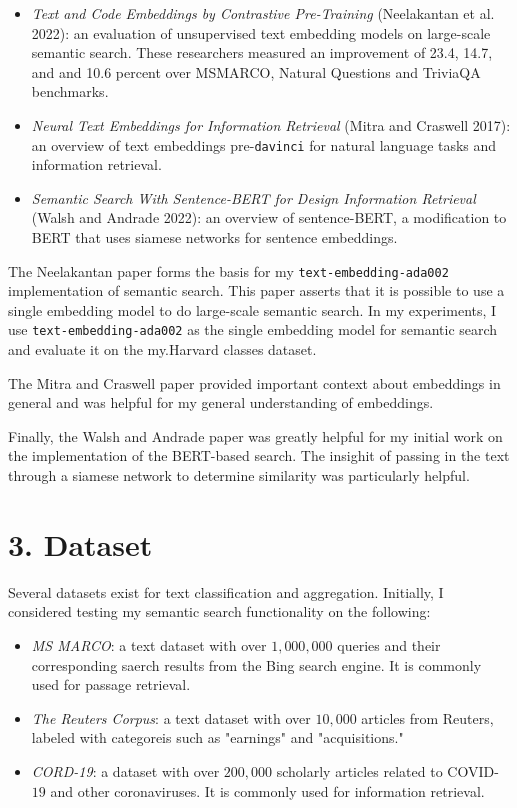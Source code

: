 \documentclass[
	a4paper, %
	10pt, %
	unnumberedsections, %
	twoside, %
]{LTJournalArticle}
\begin{document}
\begin{itemize}
	\item \textit{Text and Code Embeddings by Contrastive Pre-Training} (Neelakantan et al. 2022): an evaluation of unsupervised text embedding models on large-scale semantic search. These researchers measured an improvement of 23.4, 14.7, and and 10.6 percent over MSMARCO, Natural Questions and TriviaQA benchmarks. 
	\item \textit{Neural Text Embeddings for Information Retrieval} (Mitra and Craswell 2017): an overview of text embeddings pre-\texttt{davinci} for natural language tasks and information retrieval. 
	\item \textit{Semantic Search With Sentence-BERT for Design Information Retrieval} (Walsh and Andrade 2022): an overview of sentence-BERT, a modification to BERT that uses siamese networks for sentence embeddings. 
\end{itemize}

The Neelakantan paper forms the basis for my \texttt{text-embedding-ada002} implementation of semantic search. This paper asserts that it is possible to use a single embedding model to do large-scale semantic search. In my experiments, I use \texttt{text-embedding-ada002}  as the single embedding model for semantic search and evaluate it on the my.Harvard classes dataset. 

The Mitra and Craswell paper provided important context about embeddings in general and was helpful for my general understanding of embeddings.

Finally, the Walsh and Andrade paper was greatly helpful for my initial work on the implementation of the BERT-based search. The insighit of passing in the text through a siamese network to determine similarity was particularly helpful. 

\section{3. Dataset}

Several datasets exist for text classification and  aggregation. Initially, I considered testing my semantic search functionality on the following: 
\begin{itemize}
	\item \textit{MS MARCO}: a text dataset with over $1,000,000$ queries and their corresponding saerch results from the Bing search engine. It is commonly used for passage retrieval. 
	\item \textit{The Reuters Corpus}: a text dataset with over $10,000$ articles from Reuters, labeled with categoreis such as "earnings" and "acquisitions."
	\item \textit{CORD-19}: a dataset with over $200,000$ scholarly articles related to COVID-$19$ and other coronaviruses. It is commonly used for information retrieval.
\end{itemize}
\end{document}
